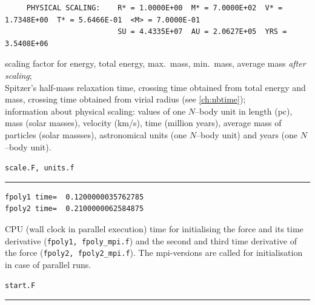 \begin{landscape}
\begin{minipage}[t]{18cm}
{\begin{verbatim}
     PHYSICAL SCALING:    R* = 1.0000E+00  M* = 7.0000E+02  V* = 1.7348E+00  T* = 5.6466E-01  <M> = 7.0000E-01
                          SU = 4.4335E+07  AU = 2.0627E+05  YRS = 3.5408E+06
\end{verbatim}
}
scaling factor for energy, total energy,
max.~mass, min.~mass, average mass {\it after scaling};\\
Spitzer's half-mass relaxation time, crossing time obtained from
total energy and mass, crossing time obtained from virial radius
(see \ref{ch:nbtime});\\
information about physical scaling: values of one $N$--body unit
in length (pc), mass (solar masses), velocity (km/s), time (million years),
average mass of particles (solar massses), astronomical units (one
$N$--body unit) and years (one $N$--body unit).
\end{minipage} \hfill
%
\begin{minipage}{4.5cm}
\begin{center}
{\tt scale.F, units.f}
\end{center}
\end{minipage}

\vspace{2ex}
\noindent
\hrule


\vspace{1ex}
\noindent
\begin{minipage}{18cm}
{\tiny
\begin{verbatim}
fpoly1 time=  0.1200000035762785     
fpoly2 time=  0.2100000062584875     
\end{verbatim}
}
CPU (wall clock in parallel execution) time for initialising
the force and its time derivative ({\tt fpoly1, fpoly\_mpi.f}) 
and the second and third time derivative of the force
({\tt fpoly2, fpoly2\_mpi.f}).
The mpi-versions are called for initialisation in case of
parallel runs.
\end{minipage} \hfill
%
\begin{minipage}{4.5cm}
\begin{center}
{\tt start.F}
\end{center}
\end{minipage}

\vspace{2ex}
\noindent
\hrule



\end{landscape}
